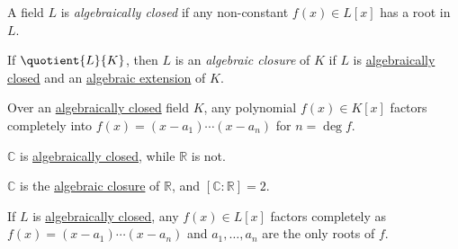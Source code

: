 \begin{definition}\label{def:algebraically-closed}
	A field \(L\) is \emph{algebraically closed} if any non-constant \(f(x)\in L[x]\) has a root in \(L\).
\end{definition}

\begin{definition}\label{def:algebraic-closure}
	If \(\quotient{L}{K} \), then \(L\) is an \emph{algebraic closure} of \(K\) if \(L\) is \hyperref[def:algebraically-closed]{algebraically closed} and an \hyperref[def:algebraic-extension]{algebraic extension} of \(K\).
\end{definition}

\begin{remark}
	Over an \hyperref[def:algebraically-closed]{algebraically closed} field \(K\), any polynomial \(f(x) \in K[x]\) factors completely into \(f(x) = (x-a_1) \cdots (x-a_n)\) for \(n = \deg f\).
\end{remark}

\begin{eg}
	\(\mathbb{C} \) is \hyperref[def:algebraically-closed]{algebraically closed}, while \(\mathbb{R} \) is not.
\end{eg}

\begin{eg}
	\(\mathbb{C} \) is the \hyperref[def:algebraically-closed]{algebraic closure} of \(\mathbb{R} \), and \([\mathbb{C} \colon \mathbb{R} ] = 2\).
\end{eg}


If \(L\) is \hyperref[def:algebraically-closed]{algebraically closed}, any \(f(x) \in L[x]\) factors completely as \(f(x) = (x-a_1)\cdots (x-a_n)\) and \(a_1, \ldots , a_n\) are the only roots of \(f\).

